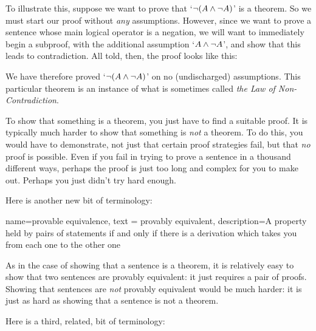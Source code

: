         To illustrate this, suppose we want to prove that `$\neg (A \mathbin{\wedge} \neg A)$' is a theorem. So we must start our proof without \emph{any} assumptions. However, since we want to prove a sentence whose main logical operator is a negation, we will want to  immediately begin a subproof, with the additional assumption `$A \mathbin{\wedge} \neg A$', and show that this leads to contradiction. All told, then, the proof looks like this:
	\begin{fitchproof}
		\open
		\close
	\end{fitchproof}
We have therefore proved `$\neg (A \mathbin{\wedge} \neg A)$' on no (undischarged) assumptions. This particular theorem is an instance of what is sometimes called \emph{the Law of Non-Contradiction}.

To show that something is a theorem, you just have to find a suitable proof. It is typically much harder to show that something is \emph{not} a theorem. To do this, you would have to demonstrate, not just that certain proof strategies fail, but that \emph{no} proof is possible. Even if you fail in trying to prove a sentence in a thousand different ways, perhaps the proof is just too long and complex for you to make out. Perhaps you just didn't try hard enough.

Here is another new bit of terminology:

{
  name=provable equivalence,
  text = provably equivalent,
description={A property held by pairs of statements if and only if there is a derivation which takes you from each one to the other one}
}


As in the case of showing that a sentence is a theorem, it is relatively easy to show that two sentences are provably equivalent: it just requires a pair of proofs. Showing that sentences are \emph{not} provably equivalent would be much harder: it is just as hard as showing that a sentence is not a theorem.

Here is a third, related, bit of terminology:

